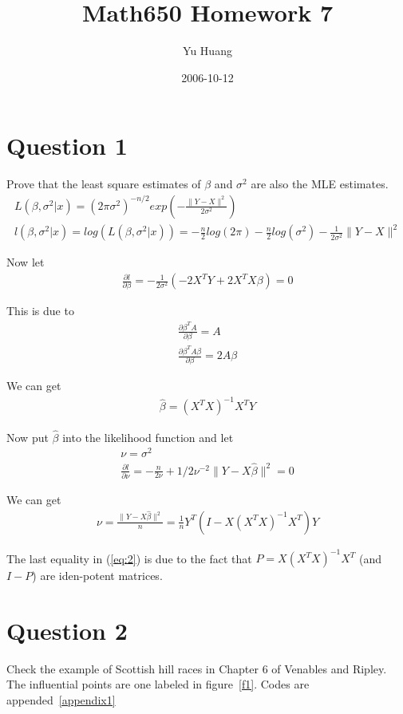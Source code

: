 \documentclass[a4paper,10pt]{article}
\title{Math650 Homework 7}
\author{Yu Huang}
\date{2006-10-12}
\begin{document}
\maketitle

\section{Question 1}
Prove that the least square estimates of $\beta$ and $\sigma^2$ are also the MLE estimates.
\begin{eqnarray}
L(\beta, \sigma^2|x) = (2\pi\sigma^2)^{-n/2}exp(-\frac{\|Y-X\| ^2}{2\sigma^2}) \nonumber \\
l(\beta, \sigma^2|x) = log(L(\beta, \sigma^2|x)) = -\frac{n}{2}log(2\pi) - \frac{n}{2}log(\sigma^2) - \frac{1}{2\sigma^2}\|Y-X\| ^2 \nonumber
\end{eqnarray}

Now let
\begin{eqnarray}
\frac{\partial{l}}{\partial{\beta}} = -\frac{1}{2\sigma^2}(-2X^T Y+2X^TX\beta)=0 \nonumber
\end{eqnarray}

This is due to
\begin{eqnarray}
\frac{\partial{\beta^TA}}{\partial{\beta}} = A \nonumber \\
\frac{\partial{\beta^TA\beta}}{\partial{\beta}} = 2A\beta \nonumber
\end{eqnarray}

We can get
\begin{eqnarray}
\hat{\beta} = (X^TX)^{-1}X^TY
\end{eqnarray}

Now put $\hat{\beta}$ into the likelihood function and let
\begin{eqnarray}
\nu = \sigma^2 \nonumber \\
\frac{\partial{l}}{\partial{\nu}} = -\frac{n}{2\nu} + 1/2\nu^{-2}\|Y-X\hat{\beta}\|^2 = 0 \nonumber
\end{eqnarray}

We can get
\begin{eqnarray} \label{eq:2}
\nu = \frac{\|Y-X\hat{\beta}\|^2}{n} = \frac{1}{n}Y^T(I-X(X^TX)^{-1}X^T)Y
\end{eqnarray}

The last equality in (\ref{eq:2}) is due to the fact that $P=X(X^TX)^{-1}X^T$ (and $I-P$) are iden-potent matrices.

\section{Question 2}
Check the example of Scottish hill races in Chapter 6 of Venables and Ripley. The influential points are one labeled in figure~\ref{f1}. Codes are appended~\ref{appendix1}
\end{document}
